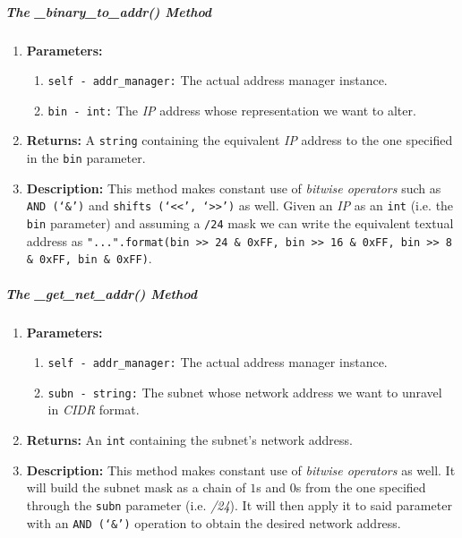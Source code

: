         \subparagraph{The \_binary\_to\_addr() Method}
            \begin{enumerate}
                \item \textbf{Parameters:}
                \begin{enumerate}
                    \item \texttt{self - addr\_manager:} The actual address manager instance.
                    \item \texttt{bin - int:} The \textit{IP} address whose representation we want to alter.
                \end{enumerate}
                \item \textbf{Returns:} A \texttt{string} containing the equivalent \textit{IP} address to the one specified in the \texttt{bin} parameter.
                \item \textbf{Description:} This method makes constant use of \textit{bitwise operators} such as \texttt{AND (`\&')} and \texttt{shifts (`<<', `>>')} as well. Given an \textit{IP} as an \texttt{int} (i.e. the \texttt{bin} parameter) and assuming a \texttt{/24} mask we can write the equivalent textual address as \texttt{"{}.{}.{}.{}".format(bin >> 24 \& 0xFF, bin >> 16 \& 0xFF, bin >> 8 \& 0xFF, bin \& 0xFF)}.
            \end{enumerate}

        \subparagraph{The \_get\_net\_addr() Method}
            \begin{enumerate}
                \item \textbf{Parameters:}
                \begin{enumerate}
                    \item \texttt{self - addr\_manager:} The actual address manager instance.
                    \item \texttt{subn - string:} The subnet whose network address we want to unravel in \textit{CIDR} format.
                \end{enumerate}
                \item \textbf{Returns:} An \texttt{int} containing the subnet's network address.
                \item \textbf{Description:} This method makes constant use of \textit{bitwise operators} as well. It will build the subnet mask as a chain of $1$s and $0$s from the one specified through the \texttt{subn} parameter (i.e. \textit{/24}). It will then apply it to said parameter with an \texttt{AND (`\&')} operation to obtain the desired network address.
            \end{enumerate}

